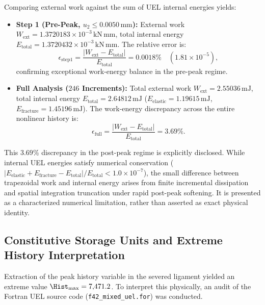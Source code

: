 Comparing external work against the sum of UEL internal energies yields:
\begin{itemize}
  \item \textbf{Step 1 (Pre-Peak, $u_2 \le 0.0050\,\mathrm{mm}$):} External work $W_{\mathrm{ext}} = 1.3720183 \times 10^{-3}\,\mathrm{kN\,mm}$, total internal energy $E_{\mathrm{total}} = 1.3720432 \times 10^{-3}\,\mathrm{kN\,mm}$. The relative error is:
  \begin{equation}
    \epsilon_{\mathrm{step1}} = \frac{|W_{\mathrm{ext}} - E_{\mathrm{total}}|}{E_{\mathrm{total}}} = 0.0018\% \quad (1.81 \times 10^{-5}),
  \end{equation}
  confirming exceptional work-energy balance in the pre-peak regime.
  \item \textbf{Full Analysis ($246$ Increments):} Total external work $W_{\mathrm{ext}} = 2.55036\,\mathrm{mJ}$, total internal energy $E_{\mathrm{total}} = 2.64812\,\mathrm{mJ}$ ($E_{\mathrm{elastic}} = 1.19615\,\mathrm{mJ}$, $E_{\mathrm{fracture}} = 1.45196\,\mathrm{mJ}$). The work-energy discrepancy across the entire nonlinear history is:
  \begin{equation}
    \epsilon_{\mathrm{full}} = \frac{|W_{\mathrm{ext}} - E_{\mathrm{total}}|}{E_{\mathrm{total}}} = 3.69\%.
  \end{equation}
\end{itemize}
This $3.69\%$ discrepancy in the post-peak regime is explicitly disclosed. While internal UEL energies satisfy numerical conservation ($|E_{\mathrm{elastic}} + E_{\mathrm{fracture}} - E_{\mathrm{total}}| / E_{\mathrm{total}} < 1.0 \times 10^{-7}$), the small difference between trapezoidal work and internal energy arises from finite incremental dissipation and spatial integration truncation under rapid post-peak softening. It is presented as a characterized numerical limitation, rather than asserted as exact physical identity.

\subsection{Constitutive Storage Units and Extreme History Interpretation}
\label{subsec:hole_history_units}

Extraction of the peak history variable in the severed ligament yielded an extreme value $\Hist_{\max} = 7{,}471.2$. To interpret this physically, an audit of the Fortran UEL source code (\texttt{f42\_mixed\_uel.for}) was conducted. 

